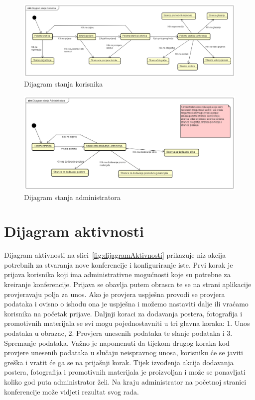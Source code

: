 			\begin{figure}[H]
				\includegraphics[width=\textwidth]{slike/korisnikStanja.PNG} %
				\caption{Dijagram stanja korisnika}
				\label{fig:korisnikStanje} %
			\end{figure}
			
			\begin{figure}[H]
				\includegraphics[width=\textwidth]{slike/adminStanja.PNG} %
				\caption{Dijagram stanja administratora}
				\label{fig:adminStanje} %
			\end{figure}
		


			\eject

		\section{Dijagram aktivnosti}

			Dijagram aktivnosti na slici~\ref{fig:dijagramAktivnosti} prikazuje niz akcija potrebnih za stvaranja nove konferencije i konfiguriranje iste. Prvi korak je prijava korisnika koji ima administrativne mogućnosti koje su potrebne za kreiranje konferencije. Prijava se obavlja putem obrasca te se na strani aplikacije provjeravaju polja za unos. Ako je provjera uspješna provodi se provjera podataka i ovisno o ishodu ona je uspješna i možemo nastaviti dalje ili vraćamo korisnika na početak prijave. Daljnji koraci za dodavanja postera, fotografija i promotivnih materijala se svi mogu pojednostavniti u tri glavna koraka: 1. Unos podataka u obrazac, 2. Provjera unesenih podataka te slanje podataka i 3. Spremanje podataka. Važno je napomenuti da tijekom drugog koraka kod provjere unesenih podataka u slučaju neispravnog unosa, korisniku će se javiti greška i vratit će ga se na prijašnji korak. Tijek izvođenja akcija dodavanja postera, fotografija i promotivnih materijala je proizvoljan i može se ponavljati koliko god puta administrator želi. Na kraju administrator na početnoj stranici konferencije može vidjeti rezultat svog rada.
			
